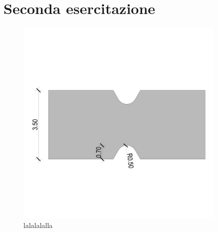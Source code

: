 \chapter{Seconda esercitazione}
\begin{figure}[htb]
    \centering
    \includegraphics[width=0.9\textwidth]{img/2Lastra.pdf}
    \caption{lalalalalla}
    \label{fig:lastra}
\end{figure}
